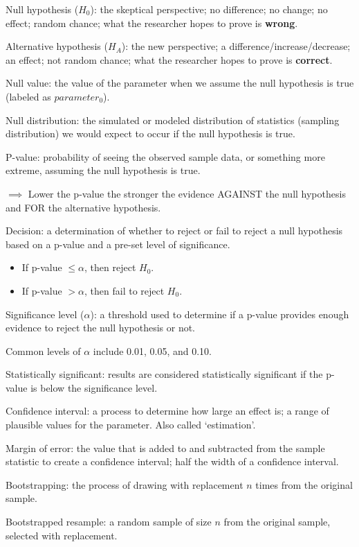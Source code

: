 \documentclass[
]{report}
\newcommand{\rgi}{\hspace{24pt}}  %
\begin{document}
Null hypothesis (\(H_0\)): the skeptical perspective; no difference; no change; no effect; random chance; what the researcher hopes to prove is \textbf{wrong}.

Alternative hypothesis (\(H_A\)): the new perspective; a difference/increase/decrease; an effect; not random chance; what the researcher hopes to prove is \textbf{correct}.

Null value: the value of the parameter when we assume the null hypothesis is true (labeled as \(parameter_0\)).

Null distribution: the simulated or modeled distribution of statistics (sampling distribution) we would expect to occur if the null hypothesis is true.

P-value: probability of seeing the observed sample data, or something more extreme, assuming the null hypothesis is true.

\(\implies\) Lower the p-value the stronger the evidence AGAINST the null hypothesis and FOR the alternative hypothesis.

Decision: a determination of whether to reject or fail to reject a null hypothesis based on a p-value and a pre-set level of significance.

\begin{itemize}
\item
  If p-value \(\leq \alpha\), then reject \(H_0\).
\item
  If p-value \(> \alpha\), then fail to reject \(H_0\).
\end{itemize}

Significance level (\(\alpha\)): a threshold used to determine if a p-value provides enough evidence to reject the null hypothesis or not.

\rgi Common levels of \(\alpha\) include 0.01, 0.05, and 0.10.

Statistically significant: results are considered statistically significant if the p-value is below the significance level.

Confidence interval: a process to determine how large an effect is; a range of plausible values for the parameter. Also called `estimation'.

Margin of error: the value that is added to and subtracted from the sample statistic to create a confidence interval; half the width of a confidence interval.

Bootstrapping: the process of drawing with replacement \(n\) times from the original sample.

Bootstrapped resample: a random sample of size \(n\) from the original sample, selected with replacement.
\end{document}
